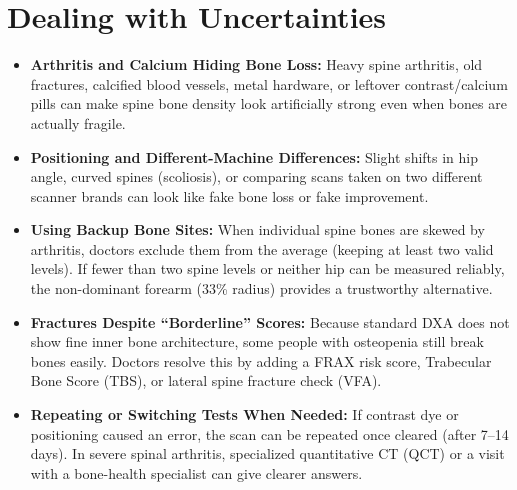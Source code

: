 \section{Dealing with Uncertainties}
\begin{itemize}
\item \textbf{Arthritis and Calcium Hiding Bone Loss:} Heavy spine arthritis, old fractures, calcified blood vessels, metal hardware, or leftover contrast/calcium pills can make spine bone density look artificially strong even when bones are actually fragile.
\item \textbf{Positioning and Different-Machine Differences:} Slight shifts in hip angle, curved spines (scoliosis), or comparing scans taken on two different scanner brands can look like fake bone loss or fake improvement.
\item \textbf{Using Backup Bone Sites:} When individual spine bones are skewed by arthritis, doctors exclude them from the average (keeping at least two valid levels). If fewer than two spine levels or neither hip can be measured reliably, the non-dominant forearm (33\% radius) provides a trustworthy alternative.
\item \textbf{Fractures Despite ``Borderline'' Scores:} Because standard DXA does not show fine inner bone architecture, some people with osteopenia still break bones easily. Doctors resolve this by adding a FRAX risk score, Trabecular Bone Score (TBS), or lateral spine fracture check (VFA).
\item \textbf{Repeating or Switching Tests When Needed:} If contrast dye or positioning caused an error, the scan can be repeated once cleared (after 7--14 days). In severe spinal arthritis, specialized quantitative CT (QCT) or a visit with a bone-health specialist can give clearer answers.
\end{itemize}

